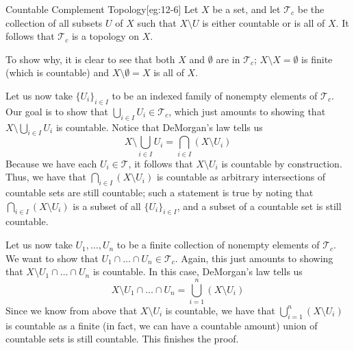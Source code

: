 \begin{egBox}{Countable Complement Topology}[eg:12-6]
    Let \( X \) be a set, and let \( \mathcal{T}_{ c } \) be the collection of all subsets \( U \) of \( X \) such that
    \( X \setminus U \) is either countable or is all of \( X \). It follows that \( \mathcal{T}_{ c } \) is a topology on \( X \).

    \baseSkip

    To show why, it is clear to see that both \( X \) and \( \emptyset \) are 
    in \( \mathcal{T}_{ c } \);
    \( X \setminus X = \emptyset \) is finite (which is countable) and \( X 
    \setminus \emptyset = X \) is all of \( X \).

    \baseSkip

    Let us now take
    \( \{ U_{ i } \}_{ i \in I } \) to be an indexed family of nonempty 
    elements of \( \mathcal{T}_{ c } \). Our
    goal is to show that \( \bigcup_{ i \in I } U_{ i } \in 
    \mathcal{T}_{ c } \), which just amounts to showing that
    \( X \setminus \bigcup_{ i \in I } U_{ i } \) is countable. Notice that 
    DeMorgan's law tells us
    \begin{equation*}
        X \setminus \bigcup_{ i \in I } U_{ i } 
        = 
        \bigcap_{ i \in I } ( X \setminus U_{ i } )
    \end{equation*}
    Because we have each \( U_{ i } \in \mathcal{T} \), it follows that \( X 
    \setminus U_{ i } \) is countable by
    construction. Thus, we
    have that \( \bigcap_{ i \in I } ( X \setminus U_{ i } ) \) is countable as 
    arbitrary intersections of countable sets are still
    countable; such a statement is true by noting that \( \bigcap_{ i \in I } 
    ( X \setminus U_{ i } ) \) is a subset of all
    \( \{ U_{ i } \}_{ i \in I } \), and a subset of a countable set is still 
    countable.

    \baseSkip

    Let us now take \( U_{ 1 }, \ldots, U_{ n } \) to be a finite collection of 
    nonempty elements of \( \mathcal{T}_{ c } \).
    We want to show that \( U_{ 1 } \cap \ldots \cap U_{ n } \in 
    \mathcal{T}_{ c } \). Again, this just amounts to showing that
    \( X \setminus U_{ 1 } \cap \ldots \cap U_{ n } \) is countable. In this 
    case, DeMorgan's law tells us
    \begin{equation*}
        X \setminus U_{ 1 } \cap \ldots \cap U_{ n }
        =
        \bigcup_{ i = 1 }^{ n } ( X \setminus U_{ i } )
    \end{equation*}
    Since we know from above that \( X \setminus U_{ i } \) is countable, we 
    have that \( \bigcup_{ i = 1 }^{ n } ( X \setminus U_{ i } ) \)
    is countable as a finite (in fact, we can have a countable amount) union of 
    countable sets is still countable.
    This finishes the proof.
\end{egBox}

